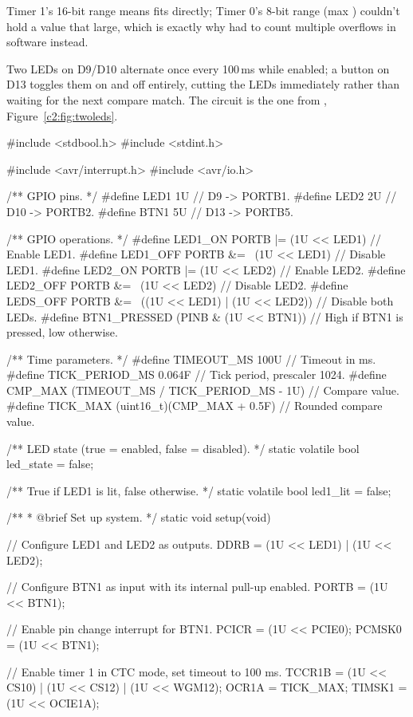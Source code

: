 \noindent Timer 1's 16-bit range means  fits directly; Timer 0's 8-bit range (max
) couldn't hold a value that large, which is exactly why  had to count
multiple overflows in software instead.

Two LEDs on D9/D10 alternate once every 100\,ms while enabled; a button on D13 toggles them on and
off entirely, cutting the LEDs immediately rather than waiting for the next compare match. The
circuit is the one from , Figure~\ref{c2:fig:twoleds}.

\begin{ccode}
#include <stdbool.h>
#include <stdint.h>

#include <avr/interrupt.h>
#include <avr/io.h>

/** GPIO pins. */
#define LED1 1U // D9  -> PORTB1.
#define LED2 2U // D10 -> PORTB2.
#define BTN1 5U // D13 -> PORTB5.

/** GPIO operations. */
#define LED1_ON PORTB |= (1U << LED1)                    // Enable LED1.
#define LED1_OFF PORTB &= ~(1U << LED1)                  // Disable LED1.
#define LED2_ON PORTB |= (1U << LED2)                    // Enable LED2.
#define LED2_OFF PORTB &= ~(1U << LED2)                  // Disable LED2.
#define LEDS_OFF PORTB &= ~((1U << LED1) | (1U << LED2)) // Disable both LEDs.
#define BTN1_PRESSED (PINB & (1U << BTN1))               // High if BTN1 is pressed, low otherwise.

/** Time parameters. */
#define TIMEOUT_MS 100U                            // Timeout in ms.
#define TICK_PERIOD_MS 0.064F                      // Tick period, prescaler 1024.
#define CMP_MAX (TIMEOUT_MS / TICK_PERIOD_MS - 1U) // Compare value.
#define TICK_MAX (uint16_t)(CMP_MAX + 0.5F)        // Rounded compare value.

/** LED state (true = enabled, false = disabled). */
static volatile bool led_state = false;

/** True if LED1 is lit, false otherwise. */
static volatile bool led1_lit = false;

/**
 * @brief Set up system.
 */
static void setup(void)
{
    // Configure LED1 and LED2 as outputs.
    DDRB = (1U << LED1) | (1U << LED2);

    // Configure BTN1 as input with its internal pull-up enabled.
    PORTB = (1U << BTN1);

    // Enable pin change interrupt for BTN1.
    PCICR  = (1U << PCIE0);
    PCMSK0 = (1U << BTN1);

    // Enable timer 1 in CTC mode, set timeout to 100 ms.
    TCCR1B = (1U << CS10) | (1U << CS12) | (1U << WGM12);
    OCR1A  = TICK_MAX;
    TIMSK1 = (1U << OCIE1A);

}
\end{ccode}

